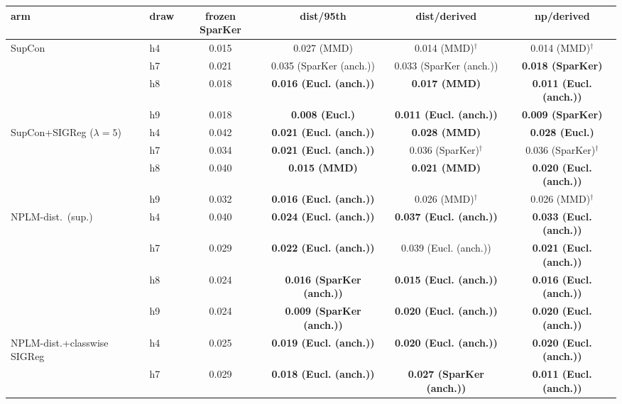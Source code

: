 \begin{table}[t]
\centering
\footnotesize
\begin{tabular}{llcccc}
\toprule
arm & draw & frozen SparKer & dist/95th & dist/derived & np/derived \\
\midrule
SupCon & h4 & 0.015 & 0.027 (MMD) & 0.014 (MMD)$^\dagger$ & 0.014 (MMD)$^\dagger$ \\
 & h7 & 0.021 & 0.035 (SparKer (anch.)) & 0.033 (SparKer (anch.)) & \textbf{0.018 (SparKer)} \\
 & h8 & 0.018 & \textbf{0.016 (Eucl. (anch.))} & \textbf{0.017 (MMD)} & \textbf{0.011 (Eucl. (anch.))} \\
 & h9 & 0.018 & \textbf{0.008 (Eucl.)} & \textbf{0.011 (Eucl. (anch.))} & \textbf{0.009 (SparKer)} \\
\addlinespace
SupCon+SIGReg ($\lambda{=}5$) & h4 & 0.042 & \textbf{0.021 (Eucl. (anch.))} & \textbf{0.028 (MMD)} & \textbf{0.028 (Eucl.)} \\
 & h7 & 0.034 & \textbf{0.021 (Eucl. (anch.))} & 0.036 (SparKer)$^\dagger$ & 0.036 (SparKer)$^\dagger$ \\
 & h8 & 0.040 & \textbf{0.015 (MMD)} & \textbf{0.021 (MMD)} & \textbf{0.020 (Eucl. (anch.))} \\
 & h9 & 0.032 & \textbf{0.016 (Eucl. (anch.))} & 0.026 (MMD)$^\dagger$ & 0.026 (MMD)$^\dagger$ \\
\addlinespace
NPLM-dist.\ (sup.) & h4 & 0.040 & \textbf{0.024 (Eucl. (anch.))} & \textbf{0.037 (Eucl. (anch.))} & \textbf{0.033 (Eucl. (anch.))} \\
 & h7 & 0.029 & \textbf{0.022 (Eucl. (anch.))} & 0.039 (Eucl. (anch.)) & \textbf{0.021 (Eucl. (anch.))} \\
 & h8 & 0.024 & \textbf{0.016 (SparKer (anch.))} & \textbf{0.015 (Eucl. (anch.))} & \textbf{0.016 (Eucl. (anch.))} \\
 & h9 & 0.024 & \textbf{0.009 (SparKer (anch.))} & \textbf{0.020 (Eucl. (anch.))} & \textbf{0.020 (Eucl. (anch.))} \\
\addlinespace
NPLM-dist.+classwise SIGReg & h4 & 0.025 & \textbf{0.019 (Eucl. (anch.))} & \textbf{0.020 (Eucl. (anch.))} & \textbf{0.020 (Eucl. (anch.))} \\
 & h7 & 0.029 & \textbf{0.018 (Eucl. (anch.))} & \textbf{0.027 (SparKer (anch.))} & \textbf{0.011 (Eucl. (anch.))} \\

\end{tabular}
\end{table}
